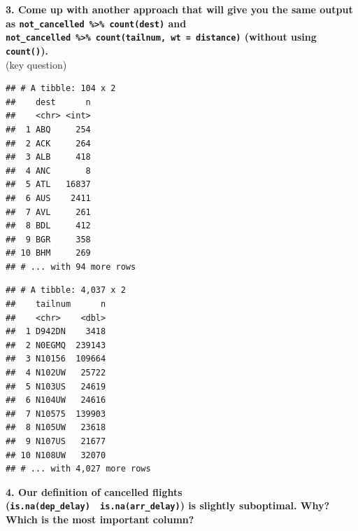 \documentclass[]{book}
\newenvironment{Shaded}{\begin{snugshade}}{\end{snugshade}}
\newcommand{\DataTypeTok}[1]{\textcolor[rgb]{0.13,0.29,0.53}{#1}}
\newcommand{\KeywordTok}[1]{\textcolor[rgb]{0.13,0.29,0.53}{\textbf{#1}}}
\newcommand{\NormalTok}[1]{#1}
\newcommand{\OperatorTok}[1]{\textcolor[rgb]{0.81,0.36,0.00}{\textbf{#1}}}
\newcommand{\StringTok}[1]{\textcolor[rgb]{0.31,0.60,0.02}{#1}}
\theoremstyle{definition}
\theoremstyle{definition}
\theoremstyle{definition}
\theoremstyle{remark}
\begin{document}
\textbf{3. Come up with another approach that will give you the same
output as \texttt{not\_cancelled\ \%\textgreater{}\%\ count(dest)} and
\texttt{not\_cancelled\ \%\textgreater{}\%\ count(tailnum,\ wt\ =\ distance)}
(without using \texttt{count()}).}\\
(key question)

\begin{Shaded}
\end{Shaded}

\begin{verbatim}
## # A tibble: 104 x 2
##    dest      n
##    <chr> <int>
##  1 ABQ     254
##  2 ACK     264
##  3 ALB     418
##  4 ANC       8
##  5 ATL   16837
##  6 AUS    2411
##  7 AVL     261
##  8 BDL     412
##  9 BGR     358
## 10 BHM     269
## # ... with 94 more rows
\end{verbatim}

\begin{Shaded}
\end{Shaded}

\begin{verbatim}
## # A tibble: 4,037 x 2
##    tailnum      n
##    <chr>    <dbl>
##  1 D942DN    3418
##  2 N0EGMQ  239143
##  3 N10156  109664
##  4 N102UW   25722
##  5 N103US   24619
##  6 N104UW   24616
##  7 N10575  139903
##  8 N105UW   23618
##  9 N107US   21677
## 10 N108UW   32070
## # ... with 4,027 more rows
\end{verbatim}

\textbf{4. Our definition of cancelled flights
(\texttt{is.na(dep\_delay)\ \textbar{}\ is.na(arr\_delay)}) is slightly
suboptimal. Why? Which is the most important column?}
\end{document}
